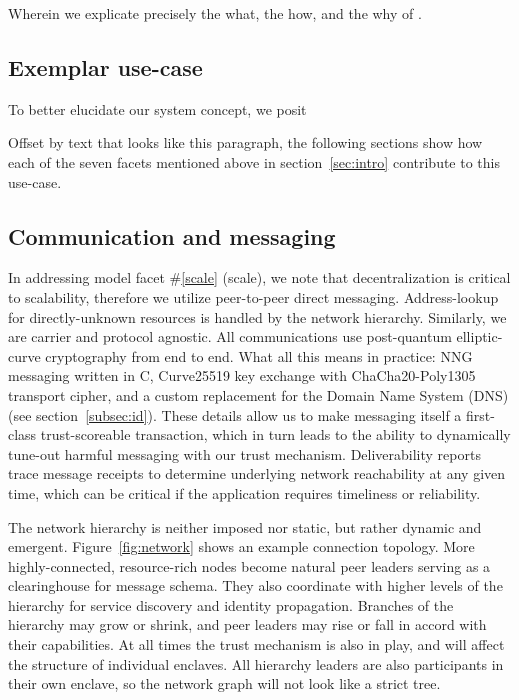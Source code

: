 Wherein we explicate precisely the what, the how, and the why of \projectName.

\subsection{Exemplar use-case}\label{subsec:use}

To better elucidate our system concept, we posit 

\begin{ppl}
Offset by text that looks like this paragraph, the following sections show how each of the seven facets mentioned above in section~\ref{sec:intro} contribute to this use-case.

\end{ppl}

\subsection{Communication and messaging}\label{subsec:comms}

In addressing model facet \#\ref{scale} (scale), we note that decentralization is critical to scalability, therefore we utilize peer-to-peer direct messaging.
Address-lookup for directly-unknown resources is handled by the network hierarchy.
Similarly, we are carrier and protocol agnostic.
All communications use post-quantum elliptic-curve cryptography from end to end.
What all this means in practice: NNG messaging written in C, Curve25519 key exchange with ChaCha20-Poly1305 transport cipher, and a custom replacement for the Domain Name System (DNS) (see section~\ref{subsec:id}).
These details allow us to make messaging itself a first-class trust-scoreable transaction, which in turn leads to the ability to dynamically tune-out harmful messaging with our trust mechanism.
Deliverability reports trace message receipts to determine underlying network reachability at any given time, which can be critical if the application requires timeliness or reliability.

The network hierarchy is neither imposed nor static, but rather dynamic and emergent.
Figure~\ref{fig:network} shows an example connection topology.
More highly-connected, resource-rich nodes become natural peer leaders serving as a clearinghouse for message schema.
They also coordinate with higher levels of the hierarchy for service discovery and identity propagation.
Branches of the hierarchy may grow or shrink, and peer leaders may rise or fall in accord with their capabilities.
At all times the trust mechanism is also in play, and will affect the structure of individual enclaves.
All hierarchy leaders are also participants in their own enclave, so the network graph will not look like a strict tree.

